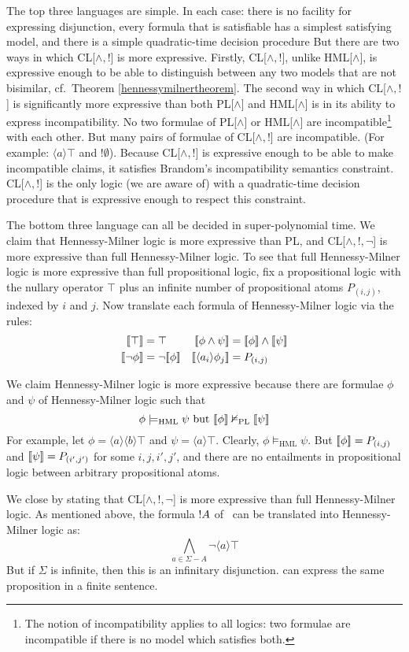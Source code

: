 \NI The top three languages are simple. In each case: there is no
facility for expressing disjunction, every formula that is satisfiable
has a simplest satisfying model, and there is a simple quadratic-time
decision procedure But there are two ways in which CL[$\land, !$] is
more expressive.  Firstly, CL[$\land, !$], unlike HML[$\land$], is expressive enough to be able to distinguish
between any two models that are not bisimilar, cf.~Theorem
\ref{hennessymilnertheorem}.  The second way in which
CL[$\land, !$] is significantly more expressive than both PL[$\land$]
and HML[$\land$] is in its ability to express incompatibility.  No two
formulae of PL[$\land$] or HML[$\land$] are incompatible\footnote{The notion of incompatibility applies to all logics: two formulae are incompatible if there is no model which satisfies both.} with each
other.  But many
pairs of formulae of CL[$\land, !$] are incompatible.  (For example:
$\langle a \rangle \top$ and $! \emptyset$).  Because CL[$\land, !$] is
expressive enough to be able to make incompatible claims, it satisfies
Brandom's incompatibility semantics constraint.
CL[$\land, !$] is the only logic (we are aware of) with a
quadratic-time decision procedure that is expressive enough to respect
this constraint. 

The bottom three language can all be decided in super-polynomial time.  We
claim that Hennessy-Milner logic is more expressive than PL, and CL[$\land, !, \neg$] is more expressive than full Hennessy-Milner logic.
To see that full Hennessy-Milner logic is more expressive than full
propositional logic, fix a propositional logic with the nullary
operator $\top$ plus an infinite number of propositional atoms
$P_{(i,j)}$, indexed by $i$ and $j$.  Now translate each formula of
Hennessy-Milner logic via the rules:
\begin{align*}
  \SEMB{\top}  & =  \top  &
  \SEMB{\phi \land \psi} & =  \SEMB{\phi} \land \SEMB{\psi}  \\
  \SEMB{\neg \phi} & =  \neg \SEMB{\phi}   &
  \SEMB{\langle a_i \rangle \phi_j} & =  P_{(i,j)} 
\end{align*}

\NI We claim Hennessy-Milner logic is more expressive because there
are formulae $\phi$ and $\psi$ of Hennessy-Milner logic such that
\[
\phi \models_{\text{{HML}}} \psi \mbox{ but } \lbrack\!\lbrack \phi \rbrack\!\rbrack \nvDash_{\text{PL}} \lbrack\!\lbrack \psi \rbrack\!\rbrack
\]
For example, let $\phi = \langle a \rangle \langle b \rangle \top$ and
$\psi = \langle a \rangle \top$.  Clearly, $\phi \models_{\text{HML}}
\psi$. But $\lbrack\!\lbrack \phi \rbrack\!\rbrack = P_{(i,j)}$ and $\lbrack\!\lbrack \psi \rbrack\!\rbrack = P_{(i',j')}$
for some $i,j,i',j'$, and there are no entailments in propositional
logic between arbitrary propositional atoms.

We close by stating that CL[$\land, !, \neg$] is more expressive than
full Hennessy-Milner logic. As mentioned above, the formula $! A$ of
\cathoristic\ can be translated into Hennessy-Milner logic as:
\[
\bigwedge_{a \in \Sigma - A} \neg \langle a \rangle \top
\]
But if $\Sigma$ is infinite, then this is an infinitary disjunction.
\Cathoristic{} can express the same proposition in a finite sentence.

